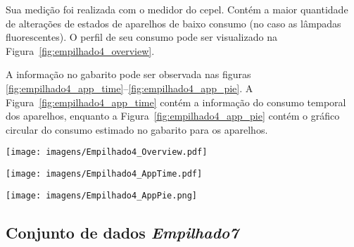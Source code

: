 Sua medição foi realizada com o medidor do \acs{cepel}. Contém a maior
quantidade de alterações de estados de aparelhos de baixo consumo (no
caso as lâmpadas fluorescentes). O
perfil de seu consumo pode ser visualizado na
Figura~\ref{fig:empilhado4_overview}.

A informação no gabarito pode ser observada nas figuras
\ref{fig:empilhado4_app_time}--\ref{fig:empilhado4_app_pie}. 
A Figura~\ref{fig:empilhado4_app_time} contém a informação do consumo
temporal dos aparelhos, enquanto a Figura~\ref{fig:empilhado4_app_pie}
contém o gráfico circular do consumo estimado no gabarito para os
aparelhos.


\begin{sidewaysfigure}[p]
\centering
\texttt{[image: imagens/Empilhado4\_Overview.pdf]}
\caption{Perfil de consumo para o conjunto de dados \emph{Empilhado4}.}
\label{fig:empilhado4_overview}
\end{sidewaysfigure}

\begin{sidewaysfigure}[p]
\centering
\texttt{[image: imagens/Empilhado4\_AppTime.pdf]}
\caption{Informação no gabarito para o conjunto de dados
\emph{Empilhado4}: consumo temporal dos aparelhos.}
\label{fig:empilhado4_app_time}
\end{sidewaysfigure}

\begin{sidewaysfigure}[p]
\centering
\texttt{[image: imagens/Empilhado4\_AppPie.png]}
\caption{Informação no gabarito para o conjunto de dados
\emph{Empilhado4}: gráfico circular do consumo dos aparelhos.}
\label{fig:empilhado4_app_pie}
\end{sidewaysfigure}

\FloatBarrier

\subsection{Conjunto de dados \emph{Empilhado7}}
\label{ssec:emp7}


